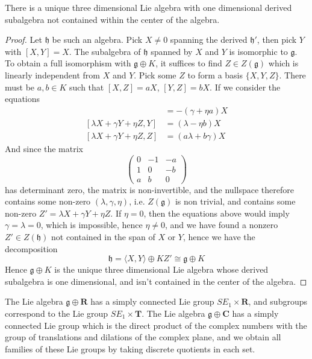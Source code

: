 \begin{theorem}
    There is a unique three dimensional Lie algebra with one dimensional derived subalgebra not contained within the center of the algebra.
\end{theorem}
\begin{proof}
    Let $\mathfrak{h}$ be such an algebra. Pick $X \neq 0$ spanning the derived $\mathfrak{h}'$, then pick $Y$ with $[X,Y] = X$. The subalgebra of $\mathfrak{h}$ spanned by $X$ and $Y$ is isomorphic to $\mathfrak{g}$. To obtain a full isomorphism with $\mathfrak{g} \oplus K$, it suffices to find $Z \in Z(\mathfrak{g})$ which is linearly independent from $X$ and $Y$. Pick some $Z$ to form a basis $\{ X, Y, Z \}$. There must be $a, b \in K$ such that $[X,Z] = aX$, $[Y,Z] = bX$. If we consider the equations
    \begin{align*}
        [\lambda X + \gamma Y + \eta Z, X] &= -(\gamma + \eta a) X\\
        [\lambda X + \gamma Y + \eta Z, Y] &= (\lambda - \eta b) X\\
        [\lambda X + \gamma Y + \eta Z, Z] &= (a \lambda + b \gamma) X
    \end{align*}
    And since the matrix 
    \[ \begin{pmatrix} 0 & -1 & -a \\ 1 & 0 & -b \\ a & b & 0 \end{pmatrix} \]
    has determinant zero, the matrix is non-invertible, and the nullspace therefore contains some non-zero $(\lambda, \gamma, \eta)$, i.e. $Z(\mathfrak{g})$ is non trivial, and contains some non-zero $Z' = \lambda X + \gamma Y + \eta Z$. If $\eta = 0$, then the equations above would imply $\gamma = \lambda = 0$, which is impossible, hence $\eta \neq 0$, and we have found a nonzero $Z' \in Z(\mathfrak{h})$ not contained in the span of $X$ or $Y$, hence we have the decomposition
    \[ \mathfrak{h} = \langle X, Y \rangle \oplus KZ' \cong \mathfrak{g} \oplus K \]
    Hence $\mathfrak{g} \oplus K$ is the unique three dimensional Lie algebra whose derived subalgebra is one dimensional, and isn't contained in the center of the algebra.
\end{proof}

The Lie algebra $\mathfrak{g} \oplus \mathbf{R}$ has a simply connected Lie group $SE_1 \times \mathbf{R}$, and subgroups correspond to the Lie group $SE_1 \times \mathbf{T}$. The Lie algebra $\mathfrak{g} \oplus \mathbf{C}$ has a simply connected Lie group which is the direct product of the complex numbers with the group of translations and dilations of the complex plane, and we obtain all families of these Lie groups by taking discrete quotients in each set.

